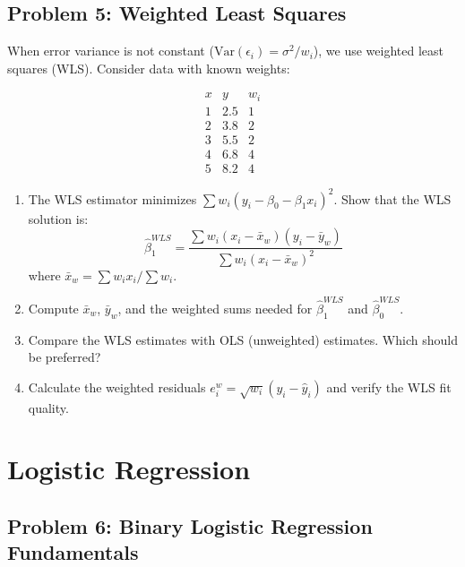 \documentclass[12pt]{article}
\begin{document}
\subsection*{Problem 5: Weighted Least Squares}

When error variance is not constant (\(\text{Var}(\epsilon_i) = \sigma^2/w_i\)), we use weighted least squares (WLS). Consider data with known weights:

\[
\begin{array}{c|c|c}
x & y & w_i \\
\hline
1 & 2.5 & 1 \\
2 & 3.8 & 2 \\
3 & 5.5 & 2 \\
4 & 6.8 & 4 \\
5 & 8.2 & 4
\end{array}
\]

\begin{enumerate}[label=(\alph*)]
\item The WLS estimator minimizes \(\sum w_i(y_i - \beta_0 - \beta_1 x_i)^2\). Show that the WLS solution is:
\[
\hat{\beta}_1^{WLS} = \frac{\sum w_i(x_i - \bar{x}_w)(y_i - \bar{y}_w)}{\sum w_i(x_i - \bar{x}_w)^2}
\]
where \(\bar{x}_w = \sum w_i x_i / \sum w_i\).

\item Compute \(\bar{x}_w\), \(\bar{y}_w\), and the weighted sums needed for \(\hat{\beta}_1^{WLS}\) and \(\hat{\beta}_0^{WLS}\).

\item Compare the WLS estimates with OLS (unweighted) estimates. Which should be preferred?

\item Calculate the weighted residuals \(e_i^w = \sqrt{w_i}(y_i - \hat{y}_i)\) and verify the WLS fit quality.
\end{enumerate}


\section{Logistic Regression}

\subsection*{Problem 6: Binary Logistic Regression Fundamentals}
\end{document}
